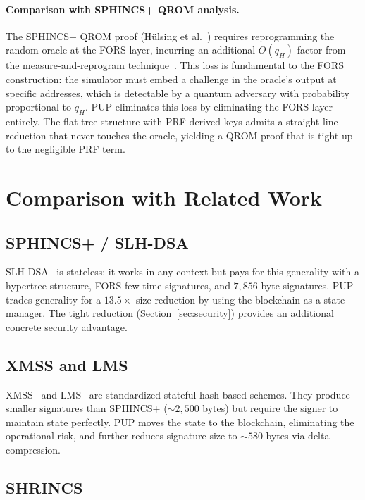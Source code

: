 \documentclass[11pt]{article}
\begin{document}
\paragraph{Comparison with SPHINCS+ QROM analysis.}
The SPHINCS+ QROM proof (H\"ulsing et al.~\cite{sphincs}) requires
reprogramming the random oracle at the FORS layer, incurring an
additional $O(q_H)$ factor from the measure-and-reprogram
technique~\cite{dongyanglong}. This loss is fundamental to the FORS
construction: the simulator must embed a challenge in the oracle's
output at specific addresses, which is detectable by a quantum
adversary with probability proportional to $q_H$. PUP eliminates
this loss by eliminating the FORS layer entirely. The flat tree
structure with PRF-derived keys admits a straight-line reduction
that never touches the oracle, yielding a QROM proof that is
tight up to the negligible PRF term.

\section{Comparison with Related Work}

\subsection{SPHINCS+ / SLH-DSA}

SLH-DSA~\cite{sphincs} is stateless: it works in any context but pays
for this generality with a hypertree structure, FORS few-time
signatures, and $7{,}856$-byte signatures. PUP trades generality for a
$13.5\times$ size reduction by using the blockchain as a state manager.
The tight reduction (Section~\ref{sec:security}) provides an additional
concrete security advantage.

\subsection{XMSS and LMS}

XMSS~\cite{xmss} and LMS~\cite{lms} are standardized stateful
hash-based schemes. They produce smaller signatures than SPHINCS+
(${\sim}2{,}500$ bytes) but require the signer to maintain state
perfectly. PUP moves the state to the blockchain, eliminating the
operational risk, and further reduces signature size to ${\sim}580$ bytes
via delta compression.

\subsection{SHRINCS}
\end{document}
